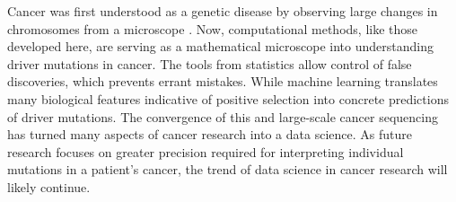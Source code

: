 Cancer was first understood as a genetic disease by observing large changes in chromosomes from a microscope \cite{RN18}. Now, computational methods, like those developed here, are serving as a mathematical microscope into understanding driver mutations in cancer. The tools from statistics allow control of false discoveries, which prevents errant mistakes. While machine learning translates many biological features indicative of positive selection into concrete predictions of driver mutations. The convergence of this and large-scale cancer sequencing has turned many aspects of cancer research into a data science. As future research focuses on greater precision required for interpreting individual mutations in a patient's cancer, the trend of data science in cancer research will likely continue.
